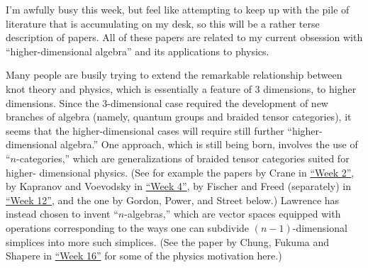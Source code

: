\documentclass{article}
\renewcommand{\texttt}[1]{%
  \begingroup
  \ttfamily
  \begingroup\lccode`~=`/\lowercase{\endgroup\def~}{/\discretionary{}{}{}}%
  \begingroup\lccode`~=`[\lowercase{\endgroup\def~}{[\discretionary{}{}{}}%
  \begingroup\lccode`~=`.\lowercase{\endgroup\def~}{.\discretionary{}{}{}}%
  \catcode`/=\active\catcode`[=\active\catcode`.=\active
  \scantokens{#1\noexpand}%
  \endgroup
}
\begin{document}
I'm awfully busy this week, but feel like attempting to keep up with the
pile of literature that is accumulating on my desk, so this will be a
rather terse description of papers. All of these papers are related to
my current obsession with ``higher-dimensional algebra'' and its
applications to physics.


Many people are busily trying to extend the remarkable relationship
between knot theory and physics, which is essentially a feature of 3
dimensions, to higher dimensions. Since the 3-dimensional case required
the development of new branches of algebra (namely, quantum groups and
braided tensor categories), it seems that the higher-dimensional cases
will require still further ``higher-dimensional algebra.'' One approach,
which is still being born, involves the use of ``\(n\)-categories,''
which are generalizations of braided tensor categories suited for
higher- dimensional physics. (See for example the papers by Crane in
\protect\hyperlink{week2}{``Week 2''}, by Kapranov and Voevodsky in
\protect\hyperlink{week4}{``Week 4''}, by Fischer and Freed (separately)
in \protect\hyperlink{week12}{``Week 12''}, and the one by Gordon,
Power, and Street below.) Lawrence has instead chosen to invent
``\(n\)-algebras,'' which are vector spaces equipped with operations
corresponding to the ways one can subdivide \((n-1)\)-dimensional
simplices into more such simplices. (See the paper by Chung, Fukuma and
Shapere in \protect\hyperlink{week16}{``Week 16''} for some of the
physics motivation here.)
\end{document}
